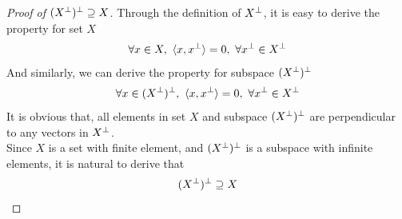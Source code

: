 \documentclass[11pt,a4paper]{article}
\begin{document}
\begin{proof}[Proof of $(X^{\perp})^{\perp} \supseteq X$]
    Through the definition of $X^{\perp}$, it is easy to derive the property for set $X$
    \begin{align}
        \forall x \in X,\ \langle x, x^{\perp} \rangle = 0,\ \forall x^{\perp}
        \in X^{\perp}
    \end{align}
    And similarly, we can derive the property for subspace $(X^{\perp})^\perp$
    \begin{align}
        \forall x \in (\Xt)^\perp,\ \langle x, x^{\perp} \rangle = 0,\ \forall x^{\perp}
        \in \Xt
    \end{align}
    It is obvious that, all elements in set $X$ and subspace $(X^{\perp})^\perp$ are
    perpendicular to any vectors in $X^{\perp}$. \\
    Since $X$ is a set with finite element, and $(X^{\perp})^\perp$ is a subspace
    with infinite elements, it is natural to derive that 
    \begin{align}
        (X^{\perp})^\perp \supseteq X
    \end{align}
\end{proof}

\newpage
\end{document}
